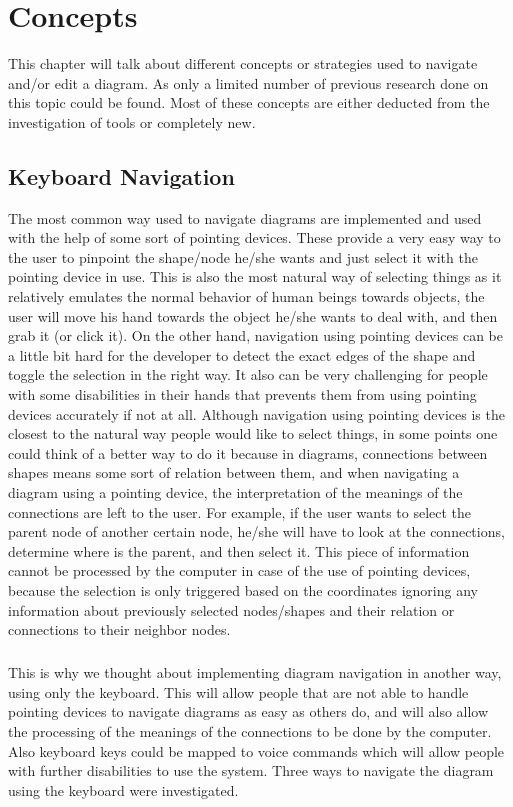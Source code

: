 \chapter{Concepts}
\beginchapter
This chapter will talk about different concepts or strategies used to navigate and/or edit a diagram. As only a limited number of previous research done on this topic could be found. Most of these concepts are either deducted from the investigation of tools or completely new.

\section{Keyboard Navigation}
The most common way used to navigate diagrams are implemented and used with the help of some sort of pointing devices. These provide a very easy way to the user to pinpoint the shape/node he/she wants and just select it with the pointing device in use. This is also the most natural way of selecting things as it relatively emulates the normal behavior of human beings towards objects, the user will move his hand towards the object he/she wants to deal with, and then grab it (or click it). On the other hand, navigation using pointing devices can be a little bit hard for the developer to detect the exact edges of the shape and toggle the selection in the right way. It also can be very challenging for people with some disabilities in their hands that prevents them from using pointing devices accurately if not at all. Although navigation using pointing devices is the closest to the natural way people would like to select things, in some points one could think of a better way to do it because in diagrams, connections between shapes means some sort of relation between them, and when navigating a diagram using a pointing device, the interpretation of the meanings of the connections are left to the user. For example, if the user wants to select the parent node of another certain node, he/she will have to look at the connections, determine where is the parent, and then select it. This piece of information cannot be processed by the computer in case of the use of pointing devices, because the selection is only triggered based on the coordinates ignoring any information about previously selected nodes/shapes and their relation or connections to their neighbor nodes.

\paragraph{}
This is why we thought about implementing diagram navigation in another way, using only the keyboard. This will allow people that are not able to handle pointing devices to navigate diagrams as easy as others do, and will also allow the processing of the meanings of the connections to be done by the computer. Also keyboard keys could be mapped to voice commands which will allow people with further disabilities to use the system. Three ways to navigate the diagram using the keyboard were investigated.

